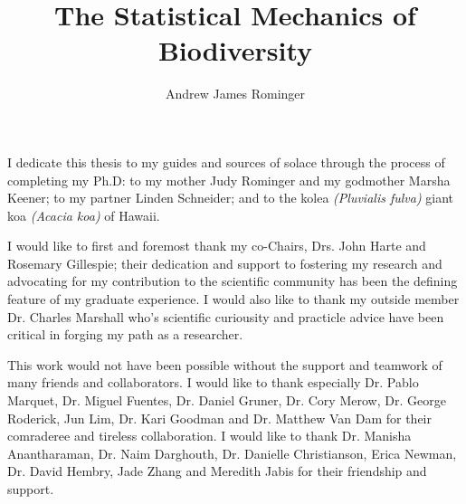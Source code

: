 \documentclass{ucbthesis}
\begin{document}

\title{The Statistical Mechanics of Biodiversity}
\author{Andrew James Rominger}

\maketitle
\approvalpage
\copyrightpage



\begin{frontmatter}

\begin{dedication}
\null\vfil
\begin{center}
  I dedicate this thesis to my guides and sources of solace through
  the process of completing my Ph.D: to my mother Judy Rominger and
  my godmother Marsha Keener; to my partner Linden Schneider; and to
  the kolea \textit{(Pluvialis fulva)} giant koa \textit{(Acacia koa)} of
  Hawaii.
\end{center}
\vfil\null
\end{dedication}


\tableofcontents
\clearpage
\listoffigures
\clearpage
\listoftables

\begin{acknowledgements}
I would like to first and foremost thank my co-Chairs, Drs. John Harte
and Rosemary Gillespie; their dedication and support to fostering my
research and advocating for my contribution to the scientific
community has been the defining feature of my graduate experience.  I
would also like to thank my outside member Dr. Charles Marshall who's
scientific curiousity and practicle advice have been critical in
forging my path as a researcher.

This work would not have been possible without the support and
teamwork of many friends and collaborators.  I would like to thank
especially Dr. Pablo Marquet, Dr. Miguel Fuentes, Dr. Daniel Gruner,
Dr. Cory Merow, Dr. George Roderick, Jun Lim, Dr. Kari Goodman and Dr.
Matthew Van Dam for their comraderee and tireless collaboration.  I
would like to thank Dr. Manisha Anantharaman, Dr. Naim Darghouth,
Dr. Danielle Christianson, Erica Newman, Dr. David Hembry, Jade Zhang
and Meredith Jabis for their friendship and support.


\end{acknowledgements}
\end{frontmatter}
\end{document}
